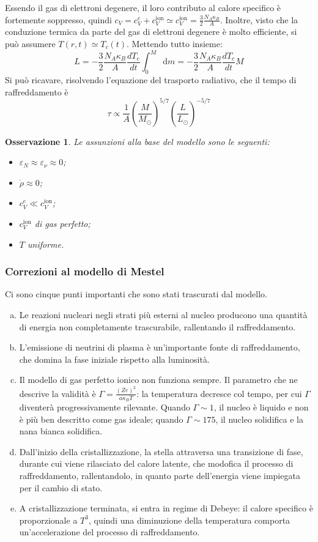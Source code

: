 \documentclass[11pt, a4paper]{scrartcl}
\theoremstyle{style}
\newtheorem{osservazione}{Osservazione}[section]
\theoremstyle{style1}
\newcommand{\dd}{\mathop{}\!\mathrm{d}}
\numberwithin{equation}{subsection}
\begin{document}
Essendo il gas di elettroni degenere, il loro contributo al calore specifico \`e fortemente soppresso, quindi $c_V = c_V^e + c_V ^\text{ion} \simeq c_V ^\text{ion} = \frac{3}{2}\frac{N_A \kappa _B}{A}$.
Inoltre, visto che la conduzione termica da parte del gas di elettroni degenere \`e molto efficiente, si pu\`o assumere $T(r,t) \simeq T_c(t)$.
Mettendo tutto insieme:
\[
L = - \frac{3}{2}\frac{N_A \kappa _B }{A}\frac{d T_c}{d t}  \int _0^M  \dd m =- \frac{3}{2}\frac{N_A \kappa _B }{A}\frac{d T_c}{d t} M
\] 
Si pu\`o ricavare, risolvendo l'equazione del trasporto radiativo, che il tempo di raffreddamento \`e
\[
\tau  \propto \frac{1}{A} \left(\frac{M}{M_\odot }\right) ^{5 / 7} \left(\frac{L}{L_\odot }\right) ^{-5 / 7}
\] 
\begin{osservazione}
Le assunzioni alla base del modello sono le seguenti:
\begin{itemize}
	\item $\varepsilon _N \approx \varepsilon _\nu \approx 0$;
	\item $\dot{\rho }\approx 0$;
	\item $c_V^e \ll c_V ^\text{ion}$;
	\item $c_V^\text{ion}$ di gas perfetto;
	\item $T$ uniforme.
\end{itemize}
\end{osservazione} 
\subsubsection{Correzioni al modello di Mestel}
Ci sono cinque punti importanti che sono stati trascurati dal modello.
\begin{enumerate}[(a).]
	\item Le reazioni nucleari negli strati pi\`u esterni al nucleo producono una quantit\`a di energia non completamente trascurabile, rallentando il raffreddamento.
	\item L'emissione di neutrini di plasma \`e un'importante fonte di raffreddamento, che domina la fase iniziale rispetto alla luminosit\`a.
	\item Il modello di gas perfetto ionico non funziona sempre. 
		Il parametro che ne descrive la validit\`a \`e $\Gamma = \frac{(Ze)^2}{a \kappa _B T}$: la temperatura decresce col tempo, per cui $\Gamma$ diventer\`a progressivamente rilevante.
		Quando $\Gamma \sim 1$, il nucleo \`e liquido e non \`e pi\`u ben descritto come gas ideale; quando $\Gamma\sim 175$, il nucleo solidifica e la nana bianca solidifica.
	\item Dall'inizio della cristallizzazione, la stella attraversa una transizione di fase, durante cui viene rilasciato del calore latente, che modofica il processo di raffreddamento, rallentandolo, in quanto parte dell'energia viene impiegata per il cambio di stato.
	\item A cristallizzazione terminata, si entra in regime di Debeye: il calore specifico \`e proporzionale a $T^3$, quindi una diminuzione della temperatura comporta un'accelerazione del processo di raffreddamento.
\end{enumerate}
\end{document}
